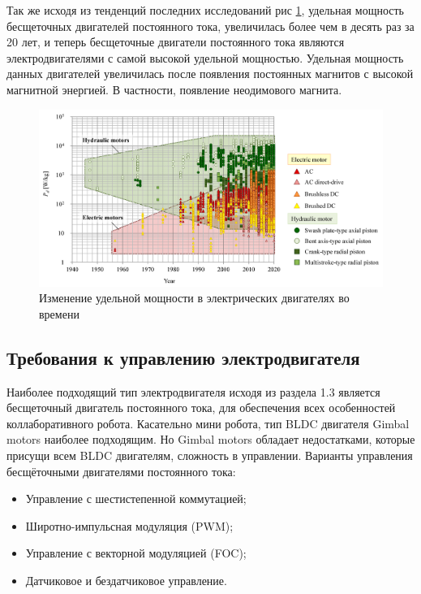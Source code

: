 Так же исходя из тенденций последних исследований \citep{Sakama2022} рис \ref{magnets}, удельная мощность бесщеточных двигателей постоянного тока, увеличилась более чем в десять раз за 20 лет, и теперь бесщеточные двигатели постоянного тока являются электродвигателями с самой высокой удельной мощностью. Удельная мощность данных двигателей увеличилась после появления постоянных магнитов с высокой магнитной энергией. В частности, появление неодимового магнита.

\begin{figure}[H]
	\centering
	\includegraphics[width=\textwidth]{Src/images/magnets.png}
	\caption{Изменение удельной мощности в электрических двигателях во времени \citep{Sakama2022}}
	\label{magnets}
\end{figure}

\subsection{Требования к управлению электродвигателя}

Наиболее подходящий тип электродвигателя исходя из раздела 1.3 является бесщеточный двигатель постоянного тока, для обеспечения всех особенностей коллаборативного робота. Касательно мини робота, тип BLDC двигателя Gimbal motors наиболее подходящим. Но Gimbal motors обладает недостатками, которые присущи всем BLDC двигателям, сложность в управлении. 
Варианты управления бесщёточными двигателями постоянного тока:
\begin{itemize}
	\item Управление с шестистепенной коммутацией;
	\item Широтно-импульсная модуляция (PWM);
	\item Управление с векторной модуляцией (FOC);
	\item Датчиковое и бездатчиковое управление.
\end{itemize}

